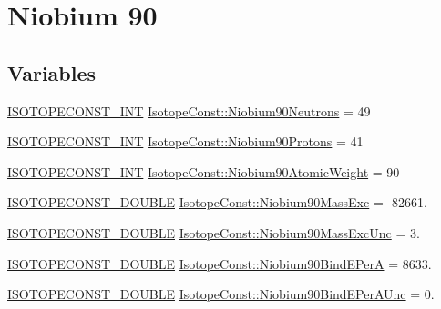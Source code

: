 \hypertarget{group___isotope_const-_niobium-_nb90}{}\section{Niobium 90}
\label{group___isotope_const-_niobium-_nb90}
\subsection*{Variables}
\begin{DoxyCompactItemize}
\item 
\mbox{\hyperlink{group___isotope_const-_macros_ga5f18360b3e99483a35c32d789e62621c}{I\+S\+O\+T\+O\+P\+E\+C\+O\+N\+S\+T\+\_\+\+I\+NT}} \mbox{\hyperlink{group___isotope_const-_niobium-_nb90_ga27aec4cca65f318c8c5730aab20ce848}{Isotope\+Const\+::\+Niobium90\+Neutrons}} = 49
\item 
\mbox{\hyperlink{group___isotope_const-_macros_ga5f18360b3e99483a35c32d789e62621c}{I\+S\+O\+T\+O\+P\+E\+C\+O\+N\+S\+T\+\_\+\+I\+NT}} \mbox{\hyperlink{group___isotope_const-_niobium-_nb90_ga32360d329c167e207764dab05a875c90}{Isotope\+Const\+::\+Niobium90\+Protons}} = 41
\item 
\mbox{\hyperlink{group___isotope_const-_macros_ga5f18360b3e99483a35c32d789e62621c}{I\+S\+O\+T\+O\+P\+E\+C\+O\+N\+S\+T\+\_\+\+I\+NT}} \mbox{\hyperlink{group___isotope_const-_niobium-_nb90_ga02ab0ee313a8feb388ab3d25ad70b0c1}{Isotope\+Const\+::\+Niobium90\+Atomic\+Weight}} = 90
\item 
\mbox{\hyperlink{group___isotope_const-_macros_ga8f45a7272ce02c0b4c65c44636ed719a}{I\+S\+O\+T\+O\+P\+E\+C\+O\+N\+S\+T\+\_\+\+D\+O\+U\+B\+LE}} \mbox{\hyperlink{group___isotope_const-_niobium-_nb90_gac33e0d9402a8aad9fc882e351d847908}{Isotope\+Const\+::\+Niobium90\+Mass\+Exc}} = -\/82661.
\item 
\mbox{\hyperlink{group___isotope_const-_macros_ga8f45a7272ce02c0b4c65c44636ed719a}{I\+S\+O\+T\+O\+P\+E\+C\+O\+N\+S\+T\+\_\+\+D\+O\+U\+B\+LE}} \mbox{\hyperlink{group___isotope_const-_niobium-_nb90_gac32288b25d8a1284740b5736a1dfcd3c}{Isotope\+Const\+::\+Niobium90\+Mass\+Exc\+Unc}} = 3.
\item 
\mbox{\hyperlink{group___isotope_const-_macros_ga8f45a7272ce02c0b4c65c44636ed719a}{I\+S\+O\+T\+O\+P\+E\+C\+O\+N\+S\+T\+\_\+\+D\+O\+U\+B\+LE}} \mbox{\hyperlink{group___isotope_const-_niobium-_nb90_ga031b5025536fb9604f22ef1d60fde400}{Isotope\+Const\+::\+Niobium90\+Bind\+E\+PerA}} = 8633.
\item 
\mbox{\hyperlink{group___isotope_const-_macros_ga8f45a7272ce02c0b4c65c44636ed719a}{I\+S\+O\+T\+O\+P\+E\+C\+O\+N\+S\+T\+\_\+\+D\+O\+U\+B\+LE}} \mbox{\hyperlink{group___isotope_const-_niobium-_nb90_gae8fb8eac8a6cc16a4624182364338fa7}{Isotope\+Const\+::\+Niobium90\+Bind\+E\+Per\+A\+Unc}} = 0.

\end{DoxyCompactItemize}
